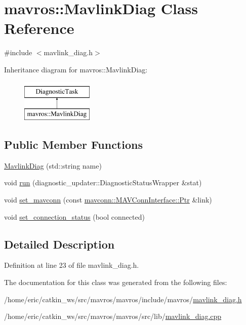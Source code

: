 \hypertarget{classmavros_1_1MavlinkDiag}{}\section{mavros\+::Mavlink\+Diag Class Reference}
\label{classmavros_1_1MavlinkDiag}


{\ttfamily \#include $<$mavlink\+\_\+diag.\+h$>$}

Inheritance diagram for mavros\+::Mavlink\+Diag\+:\begin{figure}[H]
\begin{center}
\leavevmode
\includegraphics[height=2.000000cm]{classmavros_1_1MavlinkDiag}
\end{center}
\end{figure}
\subsection*{Public Member Functions}
\begin{DoxyCompactItemize}
\item 
\mbox{\hyperlink{group__nodelib_ga7e52b64de8101152cb7da231bb6f0e6b}{Mavlink\+Diag}} (std\+::string name)
\item 
void \mbox{\hyperlink{group__nodelib_gae5789a005615261233f253b00366693a}{run}} (diagnostic\+\_\+updater\+::\+Diagnostic\+Status\+Wrapper \&stat)
\item 
void \mbox{\hyperlink{group__nodelib_gaac672d37b57dc4d73ec73de04ea436ed}{set\+\_\+mavconn}} (const \mbox{\hyperlink{group__mavconn_gaff41078b805e1d8f85ed6fd2d87711ce}{mavconn\+::\+M\+A\+V\+Conn\+Interface\+::\+Ptr}} \&link)
\item 
void \mbox{\hyperlink{group__nodelib_ga53b91990e409eb66ad3dfcc6cefa0435}{set\+\_\+connection\+\_\+status}} (bool connected)
\end{DoxyCompactItemize}


\subsection{Detailed Description}


Definition at line 23 of file mavlink\+\_\+diag.\+h.



The documentation for this class was generated from the following files\+:\begin{DoxyCompactItemize}
\item 
/home/eric/catkin\+\_\+ws/src/mavros/mavros/include/mavros/\mbox{\hyperlink{mavlink__diag_8h}{mavlink\+\_\+diag.\+h}}\item 
/home/eric/catkin\+\_\+ws/src/mavros/mavros/src/lib/\mbox{\hyperlink{mavlink__diag_8cpp}{mavlink\+\_\+diag.\+cpp}}\end{DoxyCompactItemize}
